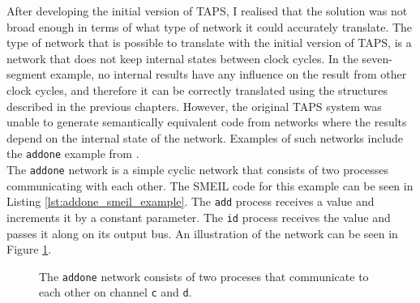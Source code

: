 After developing the initial version of TAPS, I realised that the solution was not broad enough in terms of what type of network it could accurately translate. The type of network that is possible to translate with the initial version of TAPS, is a network that does not keep internal states between clock cycles.
In the seven-segment example, no internal results have any influence on the result from other clock cycles, and therefore it can be correctly translated using the structures described in the previous chapters.
However, the original TAPS system was unable to generate semantically equivalent \cspm{} code from networks where the results depend on the internal state of the network. Examples of such networks include the \texttt{addone} example from \cite{smeil}.\\

The \texttt{addone} network is a simple cyclic network that consists of two processes communicating with each other. The SMEIL code for this example can be seen in Listing \ref{lst:addone_smeil_example}. The \texttt{add} process receives a value and increments it by a constant parameter. The \texttt{id} process receives the value and passes it along on its output bus.
An illustration of the network can be seen in Figure \ref{fig:addone_unclocked}.\\
\begin{figure}
    \centering
    \caption{The \texttt{addone} network consists of two proceses that communicate to each other on channel \texttt{c} and \texttt{d}.}
    \label{fig:addone_unclocked}
\end{figure}

